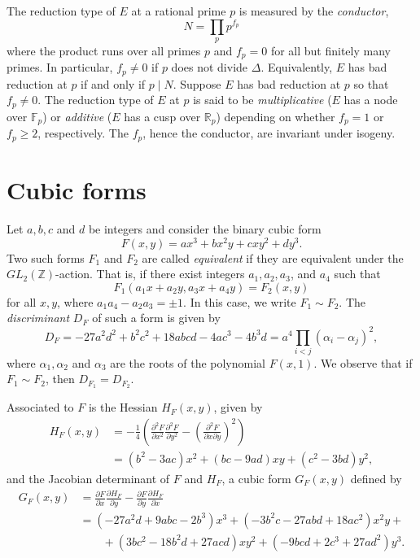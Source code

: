 The reduction type of $E$ at a rational prime $p$ is measured by the \textit{conductor}, 
\[N = \prod_{p}p^{f_p}\]
where the product runs over all primes $p$ and $f_p = 0$ for all but finitely many primes. In particular, $f_p \neq 0$ if $p$ does not divide $\Delta$. Equivalently, $E$ has bad reduction at $p$ if and only if $p \mid N$. Suppose $E$ has bad reduction at $p$ so that $f_p \neq 0$. The reduction type of $E$ at $p$ is said to be \textit{multiplicative} ($E$ has a node over $\mathbb{F}_p$) or \textit{additive} ($E$ has a cusp over $\mathbb{R}_p$) depending on whether $f_p = 1$ or $f_p \geq 2$, respectively. The $f_p$, hence the conductor, are invariant under isogeny. 


\section{Cubic forms}
\label{sec:CubicForms}

Let $a,b,c$ and $d$ be integers and consider the binary cubic form
\[F(x,y) = ax^3 + bx^2y + cxy^2 + dy^3.\]
Two such forms $F_1$ and $F_2$ are called \textit{equivalent} if they are equivalent under the $GL_{2}(\mathbb{Z})$-action. That is, if there exist integers $a_1, a_2, a_3$, and $a_4$ such that 
\[F_1(a_1x + a_2y, a_3x + a_4y) = F_2(x,y)\]
for all $x,y$, where $a_1a_4 - a_2a_3 = \pm 1$. In this case, we write $F_1 \sim F_2$. The \textit{discriminant} $D_F$ of such a form is given by 
\[D_F = -27a^2d^2 + b^2c^2 + 18abcd - 4ac^3 - 4b^3d = a^4 \prod_{i < j} (\alpha_i - \alpha_j)^2,\]
where $\alpha_1, \alpha_2$ and $\alpha_3$ are the roots of the polynomial $F(x,1)$. We observe that if $F_1 \sim F_2$, then $D_{F_1} = D_{F_2}$. 

Associated to $F$ is the Hessian $H_F(x,y)$, given by
\begin{align*}
H_F(x,y) & = -\frac{1}{4}\left( \frac{\partial^2F}{\partial x^2} \frac{\partial^2F}{\partial y^2} - \left(\frac{\partial^2F}{\partial x \partial y}\right)^2\right)\\
& = (b^2 - 3ac)x^2 + (bc - 9ad)xy + (c^2 - 3bd)y^2,
\end{align*}
and the Jacobian determinant of $F$ and $H_F$, a cubic form $G_F(x,y)$ defined by
\begin{align*}
G_F(x,y) &= \frac{\partial F}{\partial x} \frac{\partial H_F}{\partial y} - \frac{\partial F}{\partial y} \frac{\partial H_F}{\partial x} \\
& =  (-27a^2d + 9abc -2b^3)x^3 + (-3b^2c - 27abd + 18ac^2)x^2y +  \\
& \quad \quad + (3bc^2 - 18b^2d + 27acd)xy^2 + (-9bcd + 2c^3 + 27ad^2)y^3.
\end{align*}


\endinput

Any text after an \endinput is ignored.
You could put scraps here or things in progress.
